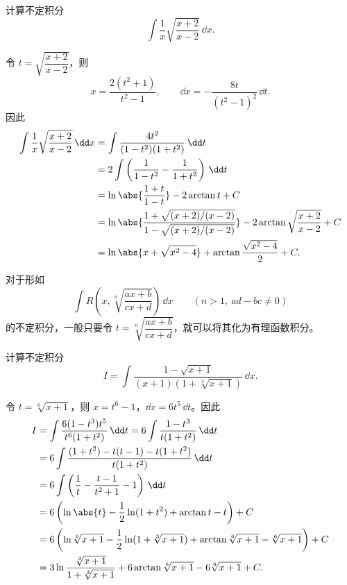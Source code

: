 \begin{xexample}[9.2.7]
计算不定积分
\[
  \int\frac1x\sqrt{\frac{x+2}{x-2}}\,\dd x.
\]
\end{xexample}

\begin{xsolution}
令 $t=\sqrt{\dfrac{x+2}{x-2}}$，则
\[
  x=\frac{2(t^2+1)}{t^2-1},
  \qquad
  \dd x=-\frac{8t}{(t^2-1)^2}\,\dd t.
\]
因此
\begin{align*}
  \int\frac1x\sqrt{\frac{x+2}{x-2}}\,\dd x
  &=\int\frac{4t^2}{(1-t^2)(1+t^2)}\,\dd t\\
  &=2\int\left(\frac1{1-t^2}-\frac1{1+t^2}\right)\,\dd t\\
  &=\ln\abs{\frac{1+t}{1-t}}-2\arctan t+C\\
  &=\ln\abs{\frac{1+\sqrt{(x+2)/(x-2)}}{1-\sqrt{(x+2)/(x-2)}}}
    -2\arctan\sqrt{\frac{x+2}{x-2}}+C\\
  &=\ln\abs{x+\sqrt{x^2-4}}+\arctan\frac{\sqrt{x^2-4}}2+C.
\end{align*}
\end{xsolution}

\begin{xremark}
对于形如
\[
  \int R\left(x,\sqrt[n]{\frac{ax+b}{cx+d}}\right)\,\dd x
  \qquad(n>1,\ ad-bc\ne0)
\]
的不定积分，一般只要令 $t=\sqrt[n]{\dfrac{ax+b}{cx+d}}$，就可以将其化为有理函数积分。
\end{xremark}

\begin{xexample}[9.2.8]
计算不定积分
\[
  I=\int\frac{1-\sqrt{x+1}}{(x+1)(1+\sqrt[3]{x+1})}\,\dd x.
\]
\end{xexample}

\begin{xsolution}
令 $t=\sqrt[6]{x+1}$，则 $x=t^6-1$，$\dd x=6t^5\,\dd t$。因此
\begin{align*}
  I
  &=\int\frac{6(1-t^3)t^5}{t^6(1+t^2)}\,\dd t
   =6\int\frac{1-t^3}{t(1+t^2)}\,\dd t\\
  &=6\int\frac{(1+t^2)-t(t-1)-t(1+t^2)}{t(1+t^2)}\,\dd t\\
  &=6\int\left(\frac1t-\frac{t-1}{t^2+1}-1\right)\,\dd t\\
  &=6\left(\ln\abs{t}-\frac12\ln(1+t^2)+\arctan t-t\right)+C\\
  &=6\left(\ln\sqrt[6]{x+1}-\frac12\ln(1+\sqrt[3]{x+1})
    +\arctan\sqrt[6]{x+1}-\sqrt[6]{x+1}\right)+C\\
  &=3\ln\frac{\sqrt[3]{x+1}}{1+\sqrt[3]{x+1}}
    +6\arctan\sqrt[6]{x+1}-6\sqrt[6]{x+1}+C.
\end{align*}
\end{xsolution}

